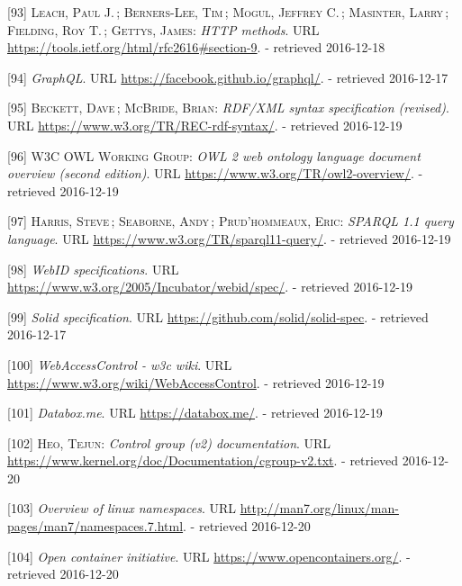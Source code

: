 \documentclass[12pt,english,a4paper,titlepage,cleardoublepage=empty,dottedtoc]{report}
\begin{document}
\hypertarget{ref-web_spec_http-methods}{}
{[}93{]} \textsc{Leach, Paul J.}\,; \textsc{Berners-Lee, Tim}\,;
\textsc{Mogul, Jeffrey C.}\,; \textsc{Masinter, Larry}\,;
\textsc{Fielding, Roy T.}\,; \textsc{Gettys, James}: \emph{HTTP
methods}. URL \url{https://tools.ietf.org/html/rfc2616\#section-9}. -
retrieved 2016-12-18

\hypertarget{ref-web_spec_graphql}{}
{[}94{]} \emph{GraphQL}. URL \url{https://facebook.github.io/graphql/}.
- retrieved 2016-12-17

\hypertarget{ref-web_w3c-tr_rdf}{}
{[}95{]} \textsc{Beckett, Dave}\,; \textsc{McBride, Brian}:
\emph{RDF/XML syntax specification (revised)}. URL
\url{https://www.w3.org/TR/REC-rdf-syntax/}. - retrieved 2016-12-19

\hypertarget{ref-web_w3c-tr_owl}{}
{[}96{]} \textsc{W3C OWL Working Group}: \emph{OWL 2 web ontology
language document overview (second edition)}. URL
\url{https://www.w3.org/TR/owl2-overview/}. - retrieved 2016-12-19

\hypertarget{ref-web_w3c-tr_sparql}{}
{[}97{]} \textsc{Harris, Steve}\,; \textsc{Seaborne, Andy}\,;
\textsc{Prud'hommeaux, Eric}: \emph{SPARQL 1.1 query language}. URL
\url{https://www.w3.org/TR/sparql11-query/}. - retrieved 2016-12-19

\hypertarget{ref-web_w3c-draft_webid}{}
{[}98{]} \emph{WebID specifications}. URL
\url{https://www.w3.org/2005/Incubator/webid/spec/}. - retrieved
2016-12-19

\hypertarget{ref-web_spec_solid}{}
{[}99{]} \emph{Solid specification}. URL
\url{https://github.com/solid/solid-spec}. - retrieved 2016-12-17

\hypertarget{ref-web_2016_wiki_webaccesscontrol}{}
{[}100{]} \emph{WebAccessControl - w3c wiki}. URL
\url{https://www.w3.org/wiki/WebAccessControl}. - retrieved 2016-12-19

\hypertarget{ref-web_2016_demo_databox}{}
{[}101{]} \emph{Databox.me}. URL \url{https://databox.me/}. - retrieved
2016-12-19

\hypertarget{ref-web_2015_cgroup-doc}{}
{[}102{]} \textsc{Heo, Tejun}: \emph{Control group (v2) documentation}.
URL \url{https://www.kernel.org/doc/Documentation/cgroup-v2.txt}. -
retrieved 2016-12-20

\hypertarget{ref-web_2016_kernel-namespace}{}
{[}103{]} \emph{Overview of linux namespaces}. URL
\url{http://man7.org/linux/man-pages/man7/namespaces.7.html}. -
retrieved 2016-12-20

\hypertarget{ref-web_2016_open-container-initiative}{}
{[}104{]} \emph{Open container initiative}. URL
\url{https://www.opencontainers.org/}. - retrieved 2016-12-20
\end{document}
